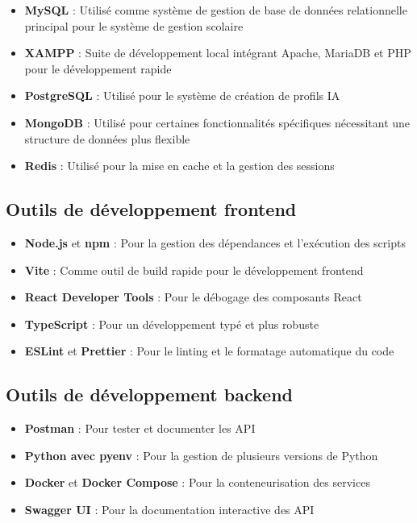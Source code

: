 \begin{itemize}
  \item \textbf{MySQL} : Utilisé comme système de gestion de base de données relationnelle principal pour le système de gestion scolaire
  
  \item \textbf{XAMPP} : Suite de développement local intégrant Apache, MariaDB et PHP pour le développement rapide
  
  \item \textbf{PostgreSQL} : Utilisé pour le système de création de profils IA
  
  \item \textbf{MongoDB} : Utilisé pour certaines fonctionnalités spécifiques nécessitant une structure de données plus flexible
  
  \item \textbf{Redis} : Utilisé pour la mise en cache et la gestion des sessions
\end{itemize}

\subsection{Outils de développement frontend}

\begin{itemize}
  \item \textbf{Node.js} et \textbf{npm} : Pour la gestion des dépendances et l'exécution des scripts
  
  \item \textbf{Vite} : Comme outil de build rapide pour le développement frontend
  
  \item \textbf{React Developer Tools} : Pour le débogage des composants React
  
  \item \textbf{TypeScript} : Pour un développement typé et plus robuste
  
  \item \textbf{ESLint} et \textbf{Prettier} : Pour le linting et le formatage automatique du code
\end{itemize}

\subsection{Outils de développement backend}

\begin{itemize}
  \item \textbf{Postman} : Pour tester et documenter les API
  
  \item \textbf{Python avec pyenv} : Pour la gestion de plusieurs versions de Python
  
  \item \textbf{Docker} et \textbf{Docker Compose} : Pour la conteneurisation des services
  
  \item \textbf{Swagger UI} : Pour la documentation interactive des API
\end{itemize}


